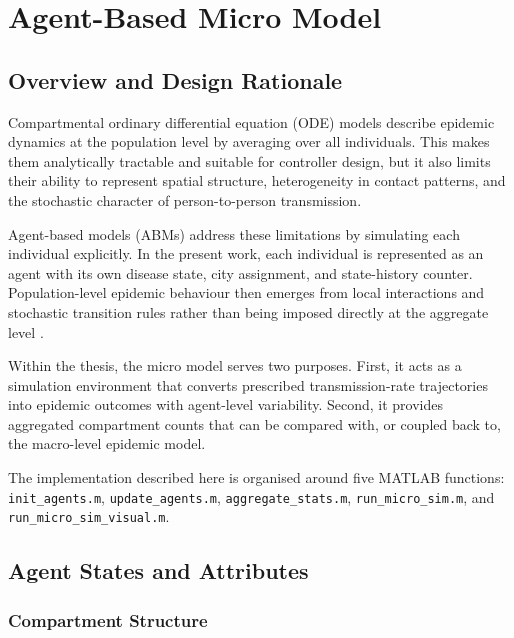 

\chapter{Agent-Based Micro Model}
\label{ch:abm}

\section{Overview and Design Rationale}
\label{sec:abm_overview}

Compartmental ordinary differential equation (ODE) models describe epidemic dynamics at the population level by averaging over all individuals.
This makes them analytically tractable and suitable for controller design, but it also limits their ability to represent spatial structure, heterogeneity in contact patterns, and the stochastic character of person-to-person transmission.

Agent-based models (ABMs) address these limitations by simulating each individual explicitly.
In the present work, each individual is represented as an agent with its own disease state, city assignment, and state-history counter.
Population-level epidemic behaviour then emerges from local interactions and stochastic transition rules rather than being imposed directly at the aggregate level \citep{zhang2025,polcz2025}.

Within the thesis, the micro model serves two purposes.
First, it acts as a simulation environment that converts prescribed transmission-rate trajectories into epidemic outcomes with agent-level variability.
Second, it provides aggregated compartment counts that can be compared with, or coupled back to, the macro-level epidemic model.

The implementation described here is organised around five MATLAB functions:
\texttt{init\_agents.m}, \texttt{update\_agents.m}, \texttt{aggregate\_stats.m}, \texttt{run\_micro\_sim.m}, and \texttt{run\_micro\_sim\_visual.m}.

\section{Agent States and Attributes}
\label{sec:agent_states}

\subsection{Compartment Structure}
\label{sec:compartments}

